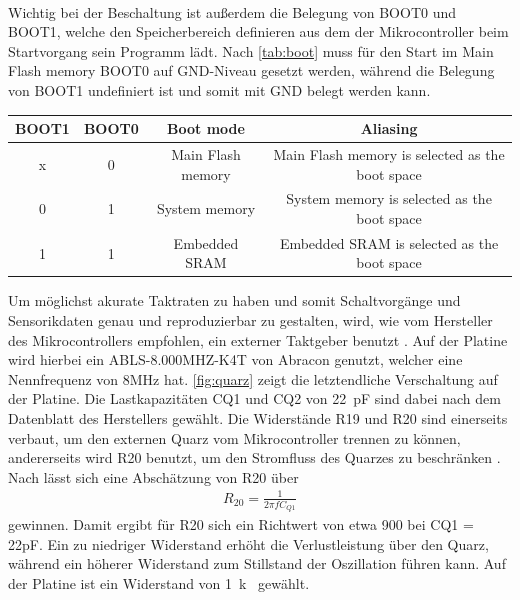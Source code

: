 \noindent\begin{minipage}{0.75\textwidth}
\label{fig:mcupin}
\end{minipage}
\noindent\begin{minipage}{0.2\textwidth}
	\label{tab:pins}
\end{minipage}
\hspace{1cm}
\newline
\\
Wichtig bei der Beschaltung ist außerdem die Belegung von BOOT0 und BOOT1, welche den Speicherbereich definieren aus dem der Mikrocontroller beim Startvorgang sein Programm lädt. Nach \autoref{tab:boot} muss für den Start im Main Flash memory BOOT0 auf GND-Niveau gesetzt werden, während die Belegung von BOOT1 undefiniert ist und somit mit GND belegt werden kann.

\begin{table}[H]%
\centering
{}
\begin{tabular}{c c c c}
BOOT1 & BOOT0 & Boot mode & Aliasing \\ \hline
x & 0 & Main Flash memory & Main Flash memory is selected as the boot space\\
0 & 1 & System memory & System memory is selected as the boot space\\
1 & 1 & Embedded SRAM & Embedded SRAM is selected as the boot space
\end{tabular}

\label{tab:boot}
\end{table}

Um möglichst akurate Taktraten zu haben und somit Schaltvorgänge und Sensorikdaten genau und reproduzierbar zu gestalten, wird, wie vom Hersteller des Mikrocontrollers empfohlen, ein externer Taktgeber benutzt \cite[S.218]{stmref}. Auf der Platine wird hierbei ein ABLS-8.000MHZ-K4T von Abracon genutzt, welcher eine Nennfrequenz von 8MHz hat. \autoref{fig:quarz} zeigt die letztendliche Verschaltung auf der Platine. Die Lastkapazitäten CQ1 und CQ2 von \SI{22}{pF} sind dabei nach dem Datenblatt des Herstellers gewählt. Die Widerstände R19 und R20 sind einerseits verbaut, um den externen Quarz vom Mikrocontroller trennen zu können, andererseits wird R20 benutzt, um den Stromfluss des Quarzes zu beschränken \cite[S.16]{stmquarz}. Nach \cite[S.16]{stmquarz} lässt sich eine Abschätzung von R20 über
\begin{align*}
R_{20} = \frac{1}{2\pi f C_{Q1}}
\end{align*}
gewinnen. Damit ergibt für R20 sich ein Richtwert von etwa \SI{900}{\Omega} bei CQ1 = 22pF. Ein zu niedriger Widerstand erhöht die Verlustleistung über den Quarz, während ein höherer Widerstand zum Stillstand der Oszillation führen kann. Auf der Platine ist ein Widerstand von \SI{1}{k\Omega} gewählt.

